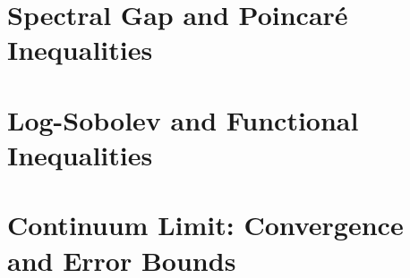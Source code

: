 \documentclass[11pt,a4paper]{report}
\begin{document}
\chapter{Spectral Gap and Poincar\'e Inequalities}
\label{ch:spectral-gap}
%
%
%
%
%
%

\chapter{Log-Sobolev and Functional Inequalities}
\label{ch:log-sobolev}


\chapter{Continuum Limit: Convergence and Error Bounds}
\label{ch:continuum-appendix}
\end{document}
